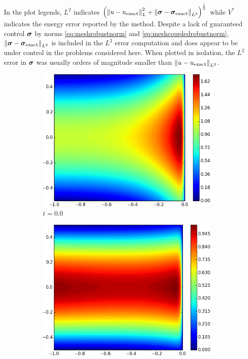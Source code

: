 \documentclass[Dissertation.tex]{subfiles}
\begin{document}
In the plot legends, $L^2$ indicates $\left( \left\| u-u_\text{exact} \right\|_L^2+\left\| \boldsymbol\sigma-\boldsymbol\sigma_\text{exact} \right\|_{L^2} \right)^{\frac{1}{2}}$ 
while $V^*$ indicates the energy error reported by the method.
Despite a lack of guaranteed control $\boldsymbol\sigma$ by norms \eqref{eq:meshrobustnorm} and \eqref{eq:meshcoupledrobustnorm},
$\left\| \boldsymbol\sigma-\boldsymbol\sigma_\text{exact} \right\|_{L^2}$ is included in the $L^2$ error computation and does appear to be under control in the problems 
considered here. When plotted in isolation, the $L^2$ error in $\boldsymbol\sigma$ was usually orders of magnitude smaller than $\left\| u-u_\text{exact} \right\|_{L^2}$.

\begin{figure}[ht]
\centering
\begin{subfigure}[t]{0.32\textwidth}
\centering
\includegraphics[width=\textwidth]{Confusion/Robustness/2d_problem_t_=_00.png}
\caption{$t=0.0$}
\end{subfigure}
\begin{subfigure}[t]{0.32\textwidth}
\centering
\includegraphics[width=\textwidth]{Confusion/Robustness/2d_problem_t_=_05.png}

\end{subfigure}
\end{figure}
\end{document}
